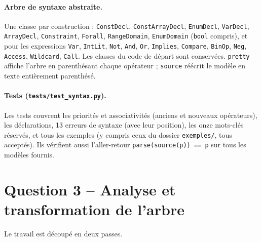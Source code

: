\documentclass[11pt,a4paper]{article}
\newcommand{\code}[1]{\texttt{#1}}
\begin{document}
\paragraph{Arbre de syntaxe abstraite.} Une classe par construction : \code{ConstDecl},
\code{ConstArrayDecl}, \code{EnumDecl}, \code{VarDecl}, \code{ArrayDecl}, \code{Constraint},
\code{Forall}, \code{RangeDomain}, \code{EnumDomain} (\code{bool} compris), et pour les
expressions \code{Var}, \code{IntLit}, \code{Not}, \code{And}, \code{Or}, \code{Implies},
\code{Compare}, \code{BinOp}, \code{Neg}, \code{Access}, \code{Wildcard}, \code{Call}. Les
classes du code de départ sont conservées. \code{pretty} affiche l'arbre en
parenthésant chaque opérateur ; \code{source} réécrit le modèle en texte entièrement
parenthésé.

\paragraph{Tests (\code{tests/test\_syntax.py}).} Les tests couvrent les priorités et
associativités (anciens et nouveaux opérateurs), les déclarations, 13 erreurs de syntaxe
(avec leur position), les onze mots-clés réservés, et tous les exemples (y compris ceux du
dossier \code{exemples/}, tous acceptés). Ils vérifient aussi l'aller-retour
\code{parse(source(p)) == p} sur tous les modèles fournis.

\section{Question 3 -- Analyse et transformation de l'arbre}

Le travail est découpé en deux passes.
\end{document}
